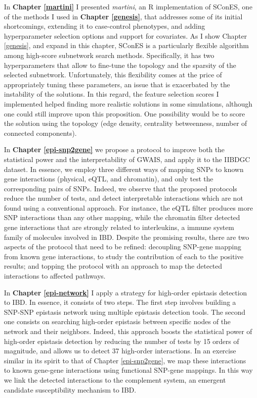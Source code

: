 \documentclass[
  11pt,
]{env/yjiao}
\begin{document}
In \textbf{Chapter \ref{martini}} I presented \emph{martini}, an R implementation of SConES, one of the methods I used in \textbf{Chapter \ref{genesis}}, that addresses some of its initial shortcomings, extending it to case-control phenotypes, and adding hyperparameter selection options and support for covariates. As I show Chapter \ref{genesis}, and expand in this chapter, SConES is a particularly flexible algorithm among high-score subnetwork search methods. Specifically, it has two hyperparameters that allow to fine-tune the topology and the sparsity of the selected subnetwork. Unfortunately, this flexibility comes at the price of appropriately tuning these parameters, an issue that is exacerbated by the instability of the solutions. In this regard, the feature selection scores I implemented helped finding more realistic solutions in some simulations, although one could still improve upon this proposition. One possibility would be to score the solution using the topology (edge density, centrality betweenness, number of connected components).

In \textbf{Chapter \ref{epi-snp2gene}} we propose a protocol to improve both the statistical power and the interpretability of GWAIS, and apply it to the IIBDGC dataset. In essence, we employ three different ways of mapping SNPs to known gene interactions (physical, eQTL, and chromatin), and only test the corresponding pairs of SNPs. Indeed, we observe that the proposed protocols reduce the number of tests, and detect interpretable interactions which are not found using a conventional approach. For instance, the eQTL filter produces more SNP interactions than any other mapping, while the chromatin filter detected gene interactions that are strongly related to interleukins, a immune system family of molecules involved in IBD. Despite the promising results, there are two aspects of the protocol that need to be refined: decoupling SNP-gene mapping from known gene interactions, to study the contribution of each to the positive results; and topping the protocol with an approach to map the detected interactions to affected pathways.

In \textbf{Chapter \ref{epi-network}} I apply a strategy for high-order epistasis detection to IBD. In essence, it consists of two steps. The first step involves building a SNP-SNP epistasis network using multiple epistasis detection tools. The second one consists on searching high-order epistasis between specific nodes of the network and their neighbors. Indeed, this approach boosts the statistical power of high-order epistasis detection by reducing the number of tests by 15 orders of magnitude, and allows us to detect 37 high-order interactions. In an exercise similar in its spirit to that of Chapter \ref{epi-snp2gene}, we map these interactions to known gene-gene interactions using functional SNP-gene mappings. In this way we link the detected interactions to the complement system, an emergent candidate susceptibility mechanism to IBD.
\end{document}
